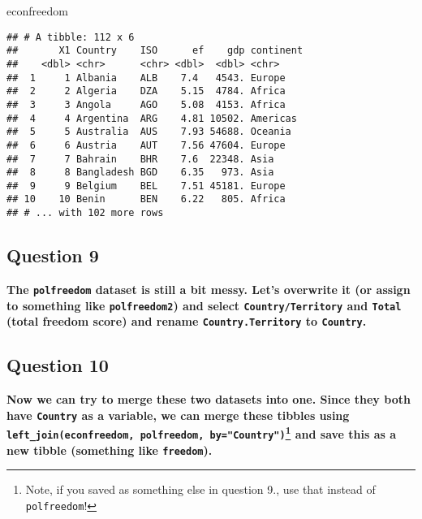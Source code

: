 \documentclass[
]{article}
\newenvironment{Shaded}{\begin{snugshade}}{\end{snugshade}}
\newcommand{\DataTypeTok}[1]{\textcolor[rgb]{0.13,0.29,0.53}{#1}}
\newcommand{\KeywordTok}[1]{\textcolor[rgb]{0.13,0.29,0.53}{\textbf{#1}}}
\newcommand{\NormalTok}[1]{#1}
\newcommand{\OperatorTok}[1]{\textcolor[rgb]{0.81,0.36,0.00}{\textbf{#1}}}
\newcommand{\StringTok}[1]{\textcolor[rgb]{0.31,0.60,0.02}{#1}}
\begin{document}
\begin{Shaded}
\begin{Highlighting}[]
\NormalTok{econfreedom}
\end{Highlighting}
\end{Shaded}

\begin{verbatim}
## # A tibble: 112 x 6
##       X1 Country    ISO      ef    gdp continent
##    <dbl> <chr>      <chr> <dbl>  <dbl> <chr>    
##  1     1 Albania    ALB    7.4   4543. Europe   
##  2     2 Algeria    DZA    5.15  4784. Africa   
##  3     3 Angola     AGO    5.08  4153. Africa   
##  4     4 Argentina  ARG    4.81 10502. Americas 
##  5     5 Australia  AUS    7.93 54688. Oceania  
##  6     6 Austria    AUT    7.56 47604. Europe   
##  7     7 Bahrain    BHR    7.6  22348. Asia     
##  8     8 Bangladesh BGD    6.35   973. Asia     
##  9     9 Belgium    BEL    7.51 45181. Europe   
## 10    10 Benin      BEN    6.22   805. Africa   
## # ... with 102 more rows
\end{verbatim}

\hypertarget{question-9}{%
\subsection{Question 9}\label{question-9}}

\textbf{The \texttt{polfreedom} dataset is still a bit messy. Let's
overwrite it (or assign to something like \texttt{polfreedom2}) and
select \texttt{Country/Territory} and \texttt{Total} (total freedom
score) and rename \texttt{Country.Territory} to \texttt{Country}.}

\begin{Shaded}
\end{Shaded}

\hypertarget{question-10}{%
\subsection{Question 10}\label{question-10}}

\textbf{Now we can try to merge these two datasets into one. Since they
both have \texttt{Country} as a variable, we can merge these tibbles
using
\texttt{left\_join(econfreedom,\ polfreedom,\ by="Country")}\footnote{Note,
  if you saved as something else in question 9., use that instead of
  \texttt{polfreedom}!} and save this as a new tibble (something like
\texttt{freedom}).}
\end{document}
